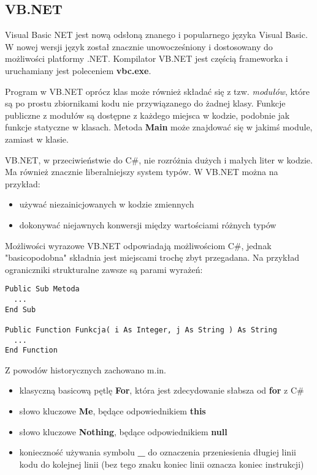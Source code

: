 ﻿\subsection{VB.NET}

Visual Basic NET jest nową odsłoną znanego i popularnego języka Visual Basic. W nowej wersji
język został znacznie unowocześniony i dostosowany do możliwości platformy .NET. Kompilator
VB.NET jest częścią frameworka i uruchamiany jest poleceniem {\bf vbc.exe}.

Program w VB.NET oprócz klas może również składać się z tzw. {\em modułów}, które
są po prostu zbiornikami kodu nie przywiązanego do żadnej klasy. Funkcje publiczne z modułów są
dostępne z każdego miejsca w kodzie, podobnie jak funkcje statyczne w klasach. Metoda {\bf Main}
może znajdować się w jakimś module, zamiast w klasie. 

VB.NET, w przeciwieństwie do C\#, nie rozróżnia dużych i małych liter w kodzie. 
Ma również znacznie liberalniejszy system typów. W VB.NET można na przykład:
\begin{itemize}
\item używać niezainicjowanych w kodzie zmiennych
\item dokonywać niejawnych konwersji między wartościami różnych typów
\end{itemize}

Możliwości wyrazowe VB.NET odpowiadają możliwościom C\#, jednak "basicopodobna" składnia jest
miejscami trochę zbyt przegadana. Na przykład ograniczniki strukturalne zawsze są parami wyrażeń:

\begin{scriptsize}
\begin{verbatim}
Public Sub Metoda
  ...
End Sub

Public Function Funkcja( i As Integer, j As String ) As String
  ...
End Function
\end{verbatim}
\end{scriptsize}

Z powodów historycznych zachowano m.in. 
\begin{itemize}
\item klasyczną basicową pętlę {\bf For}, która jest zdecydowanie słabsza
od {\bf for} z C\#
\item słowo kluczowe {\bf Me}, będące odpowiednikiem {\bf this}
\item słowo kluczowe {\bf Nothing}, będące odpowiednikiem {\bf null}
\item konieczność używania symbolu {\bf \_} do oznaczenia przeniesienia długiej linii kodu
do kolejnej linii (bez tego znaku koniec linii oznacza koniec instrukcji)
\end{itemize}

